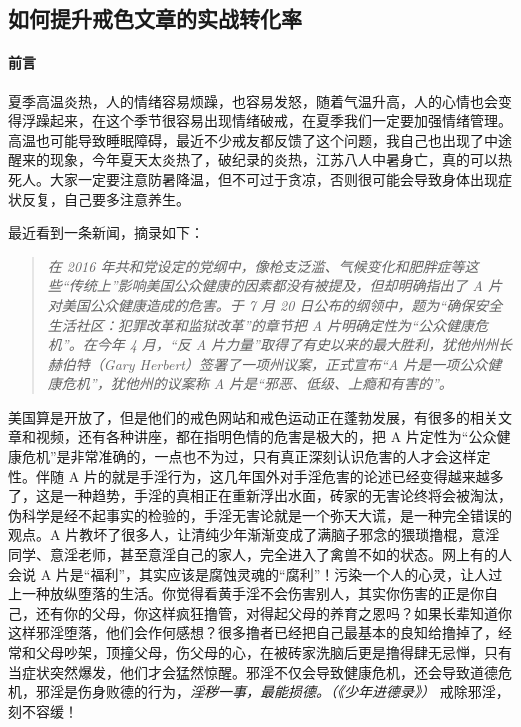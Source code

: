 \subsection{如何提升戒色文章的实战转化率}\label{108}

\paragraph*{前言}

夏季高温炎热，人的情绪容易烦躁，也容易发怒，随着气温升高，人的心情也会变得浮躁起来，在这个季节很容易出现情绪破戒，在夏季我们一定要加强情绪管理。高温也可能导致睡眠障碍，最近不少戒友都反馈了这个问题，我自己也出现了中途醒来的现象，今年夏天太炎热了，破纪录的炎热，江苏八人中暑身亡，真的可以热死人。大家一定要注意防暑降温，但不可过于贪凉，否则很可能会导致身体出现症状反复，自己要多注意养生。

最近看到一条新闻，摘录如下：

\begin{quote}\it
    在 2016 年共和党设定的党纲中，像枪支泛滥、气候变化和肥胖症等这些“传统上”影响美国公众健康的因素都没有被提及，但却明确指出了 A 片对美国公众健康造成的危害。于 7 月 20 日公布的纲领中，题为“确保安全生活社区：犯罪改革和监狱改革”的章节把 A 片明确定性为“公众健康危机”。在今年 4 月，“反 A 片力量”取得了有史以来的最大胜利，犹他州州长赫伯特（Gary Herbert）签署了一项州议案，正式宣布“A 片是一项公众健康危机”，犹他州的议案称 A 片是“邪恶、低级、上瘾和有害的”。
\end{quote}

美国算是开放了，但是他们的戒色网站和戒色运动正在蓬勃发展，有很多的相关文章和视频，还有各种讲座，都在指明色情的危害是极大的，把 A 片定性为“公众健康危机”是非常准确的，一点也不为过，只有真正深刻认识危害的人才会这样定性。伴随 A 片的就是手淫行为，这几年国外对手淫危害的论述已经变得越来越多了，这是一种趋势，手淫的真相正在重新浮出水面，砖家的无害论终将会被淘汰，伪科学是经不起事实的检验的，手淫无害论就是一个弥天大谎，是一种完全错误的观点。A 片教坏了很多人，让清纯少年渐渐变成了满脑子邪念的猥琐撸棍，意淫同学、意淫老师，甚至意淫自己的家人，完全进入了禽兽不如的状态。网上有的人会说 A 片是“福利”，其实应该是腐蚀灵魂的“腐利”！污染一个人的心灵，让人过上一种放纵堕落的生活。你觉得看黄手淫不会伤害别人，其实你伤害的正是你自己，还有你的父母，你这样疯狂撸管，对得起父母的养育之恩吗？如果长辈知道你这样邪淫堕落，他们会作何感想？很多撸者已经把自己最基本的良知给撸掉了，经常和父母吵架，顶撞父母，伤父母的心，在被砖家洗脑后更是撸得肆无忌惮，只有当症状突然爆发，他们才会猛然惊醒。邪淫不仅会导致健康危机，还会导致道德危机，邪淫是伤身败德的行为，\textit{淫秽一事，最能损德。（《少年进德录》）} 戒除邪淫，刻不容缓！

